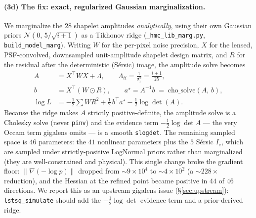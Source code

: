 \documentclass[11pt,letterpaper]{article}
\begin{document}
\paragraph{(3d) The fix: exact, regularized Gaussian marginalization.}
We marginalize the $28$ shapelet amplitudes {\it analytically}, using
their own Gaussian priors $\mathcal{N}(0,\,5/\sqrt{i+1})$ as a Tikhonov
ridge (\texttt{\_hmc\_lib\_marg.py}, \texttt{build\_model\_marg}). Writing
$W$ for the per-pixel noise precision, $X$ for the lensed, PSF-convolved,
downsampled unit-amplitude shapelet design matrix, and $R$ for the
residual after the deterministic (S\'{e}rsic) image, the amplitude solve
becomes
\begin{align*}
  A &= X^{\!\top} W X + \Lambda, \qquad
       \Lambda_{ii} = \frac{1}{\sigma_i^{2}} = \frac{i+1}{25},\\
  b &= X^{\!\top}(W\!\odot R), \qquad
       a^{\star} = A^{-1} b \;=\; \mathrm{cho\_solve}(A,\,b),\\
  \log L &= -\tfrac12\!\sum W R^{2}
            + \tfrac12\, b^{\!\top} a^{\star}
            - \tfrac12 \log\det(A).
\end{align*}
Because the ridge makes $A$ strictly positive-definite, the amplitude
solve is a Cholesky solve (never \texttt{pinv}) and the evidence term
$-\tfrac12\log\det A$ --- the very Occam term gigalens omits --- is a
smooth \texttt{slogdet}. The remaining sampled space is $46$ parameters:
the $41$ nonlinear parameters plus the $5$ S\'{e}rsic $I_{e}$, which are
sampled under strictly-positive LogNormal priors rather than
marginalized (they are well-constrained and physical). This single change
broke the gradient floor: $\|\nabla(-\log p)\|$ dropped from
$\sim 9\times10^{4}$ to $\sim 4\times10^{2}$ (a $\sim$$228\times$
reduction), and the Hessian at the refined point became positive in
$44$ of $46$ directions. We report this as an upstream gigalens issue
(\S\ref{sec:upstream}): \texttt{lstsq\_simulate} should add the
$-\tfrac12\log\det$ evidence term and a prior-derived ridge.
\end{document}
